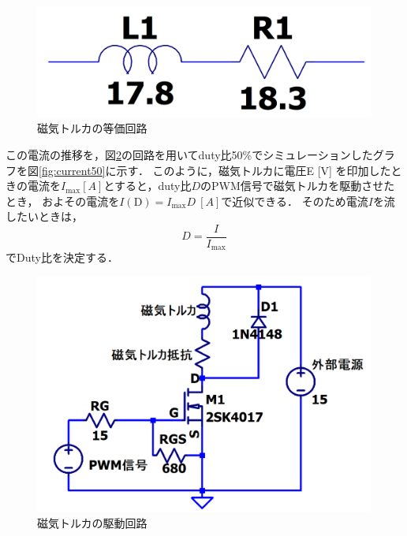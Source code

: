 \begin{figure}[H]
	\centering
		\includegraphics[scale=0.3]{./figure/touka.png}
		\caption{磁気トルカの等価回路}
		\label{fig:touka}
\end{figure}

この電流の推移を，図\ref{fig:cirkit}の回路を用いてduty比50\%でシミュレーションしたグラフを図\ref{fig:current50}に示す．
このように，磁気トルカに電圧E [V] を印加したときの電流を$I_\mathrm{max} [A]$とすると，duty比$D$のPWM信号で磁気トルカを駆動させたとき，
およその電流を$I(\mathrm{D})=I_\mathrm{max}D~[A]$で近似できる． 
そのため電流$I$を流したいときは，
\begin{equation}
	D=\frac{I}{I_\mathrm{max}}
\end{equation}
でDuty比を決定する．

\begin{figure}[H]
	\centering
		\includegraphics[scale=0.3]{./figure/駆動回路.png}
		\caption{磁気トルカの駆動回路}
		\label{fig:cirkit}
\end{figure}

